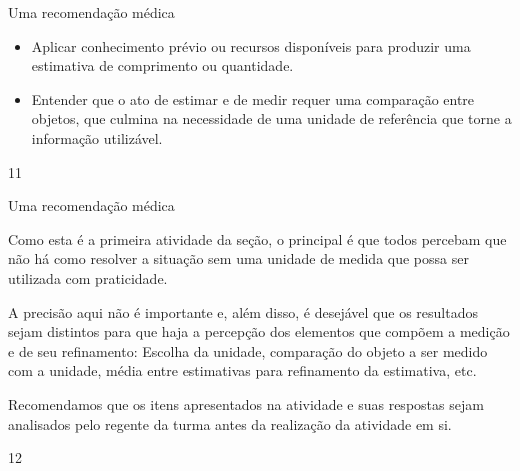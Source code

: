 \begin{objectives}{Uma recomendação médica}
{
\begin{itemize}
\item Aplicar conhecimento prévio ou recursos disponíveis para produzir uma estimativa de comprimento ou quantidade.
\item Entender que o ato de estimar e de medir requer uma comparação entre objetos, que culmina na necessidade de uma unidade de referência que torne a informação utilizável.
\end{itemize}
}{1}{1}
\end{objectives}
\begin{sugestions}{Uma recomendação médica}
{
Como esta é a primeira atividade da seção, o principal é que todos percebam que não há como resolver a situação sem uma unidade de medida que possa ser utilizada com praticidade.

A precisão aqui não é importante e, além disso, é desejável que os resultados sejam distintos para que haja a percepção dos elementos que compõem a medição e de seu refinamento: Escolha da unidade, comparação do objeto a ser medido com a unidade, média entre estimativas para refinamento da estimativa, etc.

Recomendamos que os itens apresentados na atividade e suas respostas sejam analisados pelo regente da turma antes da realização da atividade em si.
}{1}{2}
\end{sugestions}
